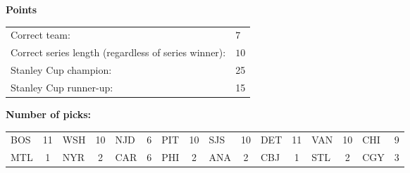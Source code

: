 \documentclass[10pt]{article}
\begin{document}
{\bf Points}\\
\begin{minipage}{12cm}
    \begin{tabular}{l l}
        Correct team:	& $7$\\
        Correct series length (regardless of series winner):	& $10$\\
        Stanley Cup champion:	& 25\\
        Stanley Cup runner-up:	& 15\\
    \end{tabular}

    \vspace{1cm}
    {\bf Number of picks:}\\
    \begin{tabular}{lc | lc | lc | lc | lc | lc | lc | lc }
        BOS & 11 & WSH & 10 & NJD & 6 & PIT & 10 & SJS & 10 & DET & 11 & VAN & 10 & CHI & 9 \\
        MTL & 1 & NYR & 2 & CAR & 6 & PHI & 2 & ANA & 2 & CBJ & 1 & STL & 2 & CGY & 3 \\
    \end{tabular}
\end{minipage}
\end{document}
